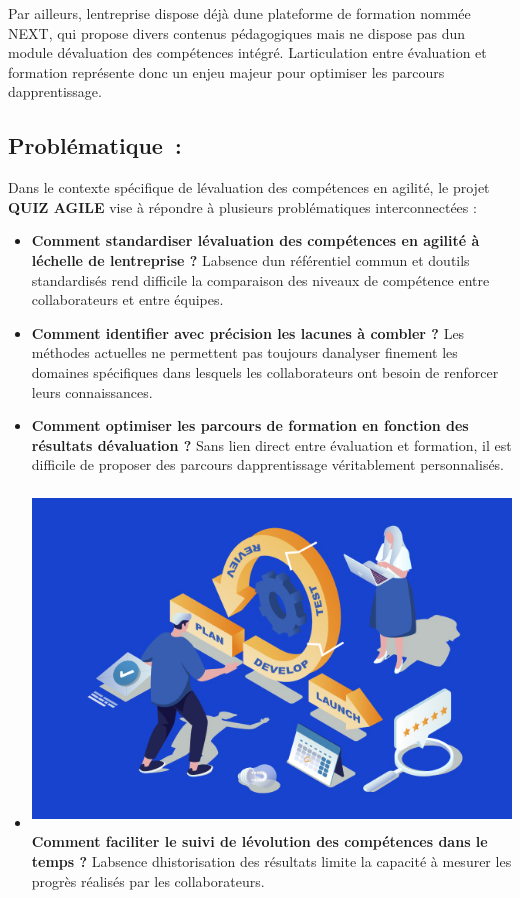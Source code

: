 \documentclass[12pt,a4paper,twoside]{report}
\begin{document}
Par ailleurs, l\textquotesingle entreprise dispose déjà
d\textquotesingle une plateforme de formation nommée NEXT, qui propose
divers contenus pédagogiques mais ne dispose pas d\textquotesingle un
module d\textquotesingle évaluation des compétences intégré.
L\textquotesingle articulation entre évaluation et formation représente
donc un enjeu majeur pour optimiser les parcours
d\textquotesingle apprentissage.

\hypertarget{probluxe9matique}{%
\subsection{Problématique~:}\label{probluxe9matique}}

Dans le contexte spécifique de l\textquotesingle évaluation des
compétences en agilité, le projet \textbf{QUIZ AGILE} vise à répondre à
plusieurs problématiques interconnectées :

\begin{itemize}
\item
  \textbf{Comment standardiser l\textquotesingle évaluation des
  compétences en agilité à l\textquotesingle échelle de
  l\textquotesingle entreprise ?} L\textquotesingle absence
  d\textquotesingle un référentiel commun et d\textquotesingle outils
  standardisés rend difficile la comparaison des niveaux de compétence
  entre collaborateurs et entre équipes.
\item
  \textbf{Comment identifier avec précision les lacunes à combler ?} Les
  méthodes actuelles ne permettent pas toujours
  d\textquotesingle analyser finement les domaines spécifiques dans
  lesquels les collaborateurs ont besoin de renforcer leurs
  connaissances.
\item
  \textbf{Comment optimiser les parcours de formation en fonction des
  résultats d\textquotesingle évaluation ?} Sans lien direct entre
  évaluation et formation, il est difficile de proposer des parcours
  d\textquotesingle apprentissage véritablement personnalisés.
\item
  \includegraphics[width=5.29167in,height=3.53061in]{latex_media/media/image7.jpeg}\textbf{Comment
  faciliter le suivi de l\textquotesingle évolution des compétences dans
  le temps ?} L\textquotesingle absence d\textquotesingle historisation
  des résultats limite la capacité à mesurer les progrès réalisés par
  les collaborateurs.
\end{itemize}
\end{document}

